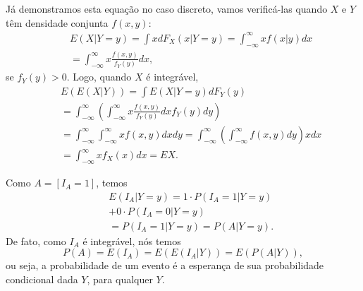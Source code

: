 \begin{frame}
\begin{block}{}
Já demonstramos esta equação no caso discreto, vamos verificá-las
quando $X$ e $Y$ têm densidade conjunta $f(x,y)$:
\begin{eqnarray}
& & E(X|Y=y)=\int xdF_X(x|Y=y)=\int_{-\infty}^{\infty}xf(x|y)dx\nonumber\\
& & =\int_{-\infty}^{\infty}x\frac{f(x,y)}{f_Y(y)}dx,\nonumber
\end{eqnarray}
se $f_{Y}(y)>0$. Logo, quando $X$ é integrável,
\begin{eqnarray}
& & E(E(X|Y))=\int
E(X|Y=y)dF_Y(y)\nonumber\\
& & =\int_{-\infty}^{\infty}(\int_{-\infty}^{\infty}x\frac{f(x,y)}{f_Y(y)}dx
f_Y(y)dy) \nonumber \\
& & =\int_{-\infty}^{\infty}\int_{-\infty}^{\infty}x f(x,y)dx
dy=\int_{-\infty}^{\infty}(\int_{-\infty}^{\infty} f(x,y)dy) x dx
\nonumber \\
& & =\int_{-\infty}^{\infty}x f_X(x)dx = EX. \nonumber
\end{eqnarray}
\end{block}
\end{frame}

\begin{frame}
\begin{block}{}


Como $A=[I_A=1]$, temos
\begin{eqnarray}
& & E(I_A|Y=y)=1\cdot P(I_A=1|Y=y)\nonumber\\
& & +0\cdot P(I_A=0|Y=y) \nonumber
\\
& & =P(I_A=1|Y=y)=P(A|Y=y). \nonumber
\end{eqnarray}
De fato, como $I_A$ é integrável, nós temos
$$P(A)=E(I_A)=E(E(I_A|Y))=E(P(A|Y)),$$
ou seja, a probabilidade de um evento é a esperança de sua
probabilidade condicional dada $Y$, para qualquer $Y$.


\end{block}
\end{frame}

